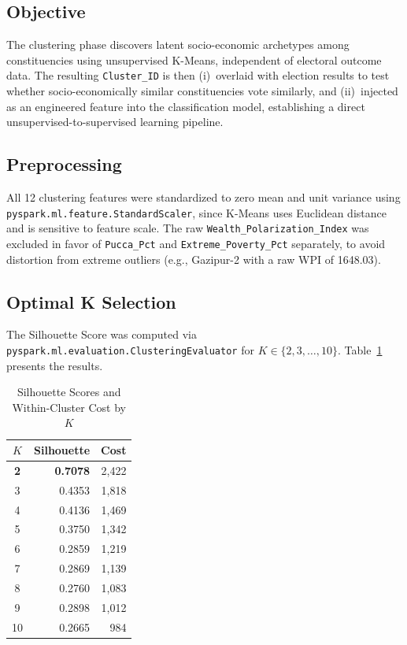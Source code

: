 \documentclass[12pt, a4paper]{article}
\begin{document}
\subsection{Objective}
The clustering phase discovers latent socio-economic archetypes among constituencies using unsupervised K-Means, independent of electoral outcome data. The resulting \texttt{Cluster\_ID} is then (i)~overlaid with election results to test whether socio-economically similar constituencies vote similarly, and (ii)~injected as an engineered feature into the classification model, establishing a direct unsupervised-to-supervised learning pipeline.

\subsection{Preprocessing}
All 12 clustering features were standardized to zero mean and unit variance using \texttt{pyspark.ml.feature.StandardScaler}, since K-Means uses Euclidean distance and is sensitive to feature scale. The raw \texttt{Wealth\_Polarization\_Index} was excluded in favor of \texttt{Pucca\_Pct} and \texttt{Extreme\_Poverty\_Pct} separately, to avoid distortion from extreme outliers (e.g., Gazipur-2 with a raw WPI of 1648.03).

\subsection{Optimal K Selection}
The Silhouette Score was computed via \texttt{pyspark.ml.evaluation.ClusteringEvaluator} for $K \in \{2, 3, \ldots, 10\}$. Table~\ref{tab:silhouette} presents the results.

\begin{table}[H]
\centering
\caption{Silhouette Scores and Within-Cluster Cost by $K$}
\label{tab:silhouette}
\small
\begin{tabular}{c r r}
\toprule
\textbf{$K$} & \textbf{Silhouette} & \textbf{Cost} \\
\midrule
\textbf{2} & \textbf{0.7078} & 2,422 \\
3 & 0.4353 & 1,818 \\
4 & 0.4136 & 1,469 \\
5 & 0.3750 & 1,342 \\
6 & 0.2859 & 1,219 \\
7 & 0.2869 & 1,139 \\
8 & 0.2760 & 1,083 \\
9 & 0.2898 & 1,012 \\
10 & 0.2665 & 984 \\
\bottomrule
\end{tabular}
\end{table}
\end{document}
